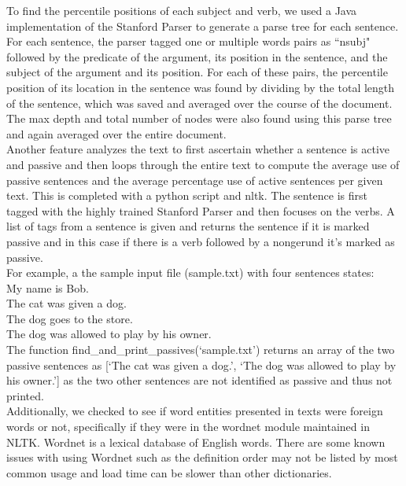 \documentclass[twocolumn]{article}
\begin{document}
  To find the percentile positions of each subject and verb, we used a Java implementation of the Stanford Parser to generate a parse tree for each sentence. For each sentence, the parser tagged one or multiple words pairs as ``nsubj" followed by the predicate of the argument, its position in the sentence, and the subject of the argument and its position. For each of these pairs, the percentile position of its location in the sentence was found by dividing by the total length of the sentence, which was saved and averaged over the course of the document. The max depth and total number of nodes were also found using this parse tree and again averaged over the entire document. \\
  
  Another feature analyzes the text to first ascertain whether a sentence is active and passive and then loops through the entire text to compute the average use of passive sentences and the average percentage use of active sentences per given text. This is completed with a python script and nltk. The sentence is first tagged with the highly trained Stanford Parser and then focuses on the verbs. A list of tags from a sentence is given and returns the sentence if it is marked passive and in this case if there is a verb followed by a nongerund it's marked as passive. \\
  
  For example, a the sample input file (sample.txt) with four sentences states: \\
  My name is Bob. \\
  The cat was given a dog. \\
  The dog goes to the store. \\
  The dog was allowed to play by his owner. \\
  
  The function find\_and\_print\_passives(`sample.txt') returns an array of the two passive sentences as [`The cat was given a dog.', `The dog was allowed to play by his owner.'] as the two other sentences are not identified as passive and thus not printed. \\
  
  Additionally, we checked to see if word entities presented in texts were foreign words or not, specifically if they were in the wordnet module maintained in NLTK. Wordnet is a lexical database of English words. There are some known issues with using Wordnet such as the definition order may not be listed by most common usage and load time can be slower than other dictionaries. \\
  
\end{document}

